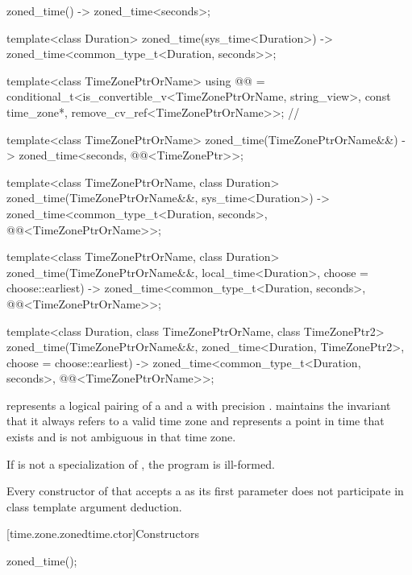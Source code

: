 \begin{codeblock}
{  zoned_time() -> zoned_time<seconds>;

  template<class Duration>
    zoned_time(sys_time<Duration>)
      -> zoned_time<common_type_t<Duration, seconds>>;

  template<class TimeZonePtrOrName>
    using @@ =
      conditional_t<is_convertible_v<TimeZonePtrOrName, string_view>,
                    const time_zone*,
                    remove_cv_ref<TimeZonePtrOrName>>;          // \expos

  template<class TimeZonePtrOrName>
    zoned_time(TimeZonePtrOrName&&)
      -> zoned_time<seconds, @@<TimeZonePtr>>;

  template<class TimeZonePtrOrName, class Duration>
    zoned_time(TimeZonePtrOrName&&, sys_time<Duration>)
      -> zoned_time<common_type_t<Duration, seconds>,
                    @@<TimeZonePtrOrName>>;

  template<class TimeZonePtrOrName, class Duration>
    zoned_time(TimeZonePtrOrName&&, local_time<Duration>,
               choose = choose::earliest)
      -> zoned_time<common_type_t<Duration, seconds>,
                    @@<TimeZonePtrOrName>>;

  template<class Duration, class TimeZonePtrOrName, class TimeZonePtr2>
    zoned_time(TimeZonePtrOrName&&, zoned_time<Duration, TimeZonePtr2>,
               choose = choose::earliest)
      -> zoned_time<common_type_t<Duration, seconds>,
                    @@<TimeZonePtrOrName>>;
}
\end{codeblock}

\pnum
{} represents a logical pairing of
a  and a  with precision .
 maintains the invariant that
it always refers to a valid time zone and
represents a point in time that exists and is not ambiguous
in that time zone.

\pnum
If  is not a specialization of ,
the program is ill-formed.

\pnum
Every constructor of  that
accepts a  as its first parameter
does not participate in
class template argument deduction.

[time.zone.zonedtime.ctor]{Constructors}

%
\begin{itemdecl}
zoned_time();
\end{itemdecl}

